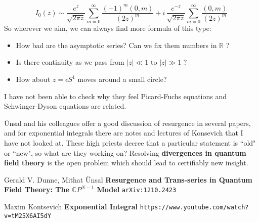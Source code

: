 \documentclass[12pt]{article}
\begin{document}
$$ I_0(z) \sim \frac{e^z}{\sqrt{2\pi z}} \sum_{m=0}^\infty \frac{(-1)^m (0,m)}{(2z)^m}
+ i\, \frac{e^{-z}}{\sqrt{2\pi z}} \sum_{m=0}^\infty \frac{ (0,m)}{(2z)^m} $$
So wherever we aim, we can always find more formula of this type:
\begin{itemize}
\item How bad are the asymptotic series?  Can we fix them numbers in $\mathbb{R}$ ?
\item Is there continuity as we pass from $|z| \ll 1$ to $|z| \gg 1$ ?  
\item How about $z = \epsilon S^1$ moves around a small circle?
\end{itemize}
I have not been able to check why they feel Picard-Fuchs equations and Schwinger-Dyson equations are related.

\newpage

\noindent \"{U}nsal and his colleagues offer a good discussion of resurgence in several papers, and for exponential integrals there are notes and lectures of Konsevich that I have not looked at.  These high priests decree that a particular statement is ``old" or ``new", so what are they working on?  Resolving \textbf{divergences in quantum field theory} is the open problem which should lead to certifiably new insight.

\vfill

\begin{thebibliography}{}

\item Gerald V. Dunne, Mithat \"{U}nsal  \textbf{Resurgence and Trans-series in Quantum Field Theory: The $\mathbb{C}P^{N-1}$ Model} \texttt{arXiv:1210.2423}

\item Maxim Kontsevich \textbf{Exponential Integral} \texttt{https://www.youtube.com/watch?v=tM25X6AI5dY}
 
\end{thebibliography}
\end{document}
